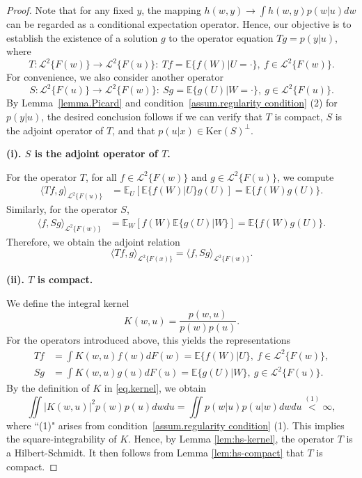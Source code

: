 \documentclass[
  12pt]{article}
\def\to{\rightarrow}
\def\cL{\mathcal{L}}
\begin{document}
\uxsolutionsexist*
\begin{proof}
Note that for any fixed $y$, the mapping $h(w,y) \to \int h(w,y)p(w|u)dw$ can be regarded as a conditional expectation operator. Hence, our objective is to establish the existence of a solution $g$ to the operator equation $Tg=p(y|u)$, where 
$$
T: \mathcal{L}^2\{F(w)\}\rightarrow  \mathcal{L}^2\{F(u)\}: \ Tf =\mathbb{E}\{ f(W)|U=\cdot\}, \ f \in \cL^2\{F(w)\}.
$$
For convenience, we also consider another operator
$$
 S:  \mathcal{L}^2\{F(u)\}\rightarrow  \mathcal{L}^2\{F(w)\}: \ Sg =\mathbb{E} \{ g(U)|W=\cdot \}, \ g \in \cL^2\{F(u)\}.
$$
By Lemma~\ref{lemma.Picard} and condition~\ref{assum.regularity condition} (2) for $p(y|u)$, the desired conclusion follows if we can verify that $T$ is compact, $S$ is the adjoint operator of $T$, and that $p(u|x) \in \mathrm{Ker}(S)^{\perp}$.

\noindent\textbf{(i). $S$ is the adjoint operator of $T$.} 

For the operator $T$, for all $f\in \mathcal{L}^2\{F(w)\}$ and $g\in \mathcal{L}^2\{F(u)\}$, we compute
\begin{align*}
	\langle Tf,g \rangle_{\mathcal{L}^2\{F(u)\}}&=\mathbb{E}_U[ \mathbb{E} \{ f(W) |U \} g(U) ]=\mathbb{E}\{f(W)g(U)\}.
\end{align*}
Similarly, for the operator $S$, 
\begin{align*}
	\langle f,Sg \rangle_{\mathcal{L}^2\{F(w)\}}&=\mathbb{E}_W[ f(W) \mathbb{E} \{ g(U) |W \} ]=\mathbb{E}\{f(W)g(U)\}.
\end{align*}
Therefore, we obtain the adjoint relation
$$
\langle Tf,g \rangle_{\mathcal{L}^2\{F(x)\}}=\langle f,Sg \rangle_{\mathcal{L}^2\{F(w)\}}.
$$

\noindent\textbf{(ii). $T$ is compact.}

We define the integral kernel
\begin{equation}\label{eq.kernel}
    K(w,u) =\frac{p(w,u)}{p(w) p(u)}.
\end{equation}
For the operators introduced above, this yields the representations
\begin{align}
    Tf &=\int{K(w,u) f(w)dF (w)}=\mathbb{E}\{ f(W) |U \}, \ f\in \mathcal{L}^2\{F(w)\}, \label{eq.T}\\
	Sg &=\int{K(w,u) g(u)dF(u)}=\mathbb{E}\{ g(U) |W \}, \ g\in \mathcal{L}^2\{F(u)\}. \label{eq.S}
\end{align}
By the definition of $K$ in \eqref{eq.kernel}, we obtain
\begin{equation*}
    \iint |K(w,u)|^2p(w)p(u)dwdu = \iint p(w|u)p(u|w)dwdu \overset{(1)}{<} \infty,
\end{equation*}
where ``(1)" arises from condition~\ref{assum.regularity condition} (1). This implies the square-integrability of $K$. Hence, by Lemma \ref{lem:hs-kernel}, the operator $T$ is a Hilbert-Schmidt. It then follows from Lemma \ref{lem:hs-compact} that $T$ is compact.



\end{proof}
\end{document}
